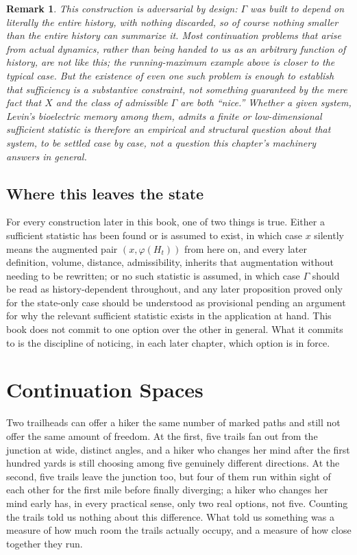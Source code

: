 \documentclass[11pt]{report}
\newtheorem{remark}{Remark}[chapter]
\begin{document}
\begin{remark}
This construction is adversarial by design: $\Gamma$ was built to
depend on literally the entire history, with nothing discarded, so of
course nothing smaller than the entire history can summarize it. Most
continuation problems that arise from actual dynamics, rather than
being handed to us as an arbitrary function of history, are not like
this; the running-maximum example above is closer to the typical case.
But the existence of even one such problem is enough to establish that
sufficiency is a substantive constraint, not something guaranteed by
the mere fact that $X$ and the class of admissible $\Gamma$ are both
``nice.'' Whether a given system, Levin's bioelectric memory among
them, admits a finite or low-dimensional sufficient statistic is
therefore an empirical and structural question about that system, to
be settled case by case, not a question this chapter's machinery
answers in general.
\end{remark}

\section*{Where this leaves the state}

For every construction later in this book, one of two things is true.
Either a sufficient statistic has been found or is assumed to exist, in
which case $x$ silently means the augmented pair $(x, \varphi(H_t))$
from here on, and every later definition, volume, distance,
admissibility, inherits that augmentation without needing to be
rewritten; or no such statistic is assumed, in which case $\Gamma$
should be read as history-dependent throughout, and any later
proposition proved only for the state-only case should be understood as
provisional pending an argument for why the relevant sufficient
statistic exists in the application at hand. This book does not commit
to one option over the other in general. What it commits to is the
discipline of noticing, in each later chapter, which option is in
force.

\chapter{Continuation Spaces}

Two trailheads can offer a hiker the same number of marked paths and
still not offer the same amount of freedom. At the first, five trails
fan out from the junction at wide, distinct angles, and a hiker who
changes her mind after the first hundred yards is still choosing among
five genuinely different directions. At the second, five trails leave
the junction too, but four of them run within sight of each other for
the first mile before finally diverging; a hiker who changes her mind
early has, in every practical sense, only two real options, not five.
Counting the trails told us nothing about this difference. What told
us something was a measure of how much room the trails actually
occupy, and a measure of how close together they run.
\end{document}
